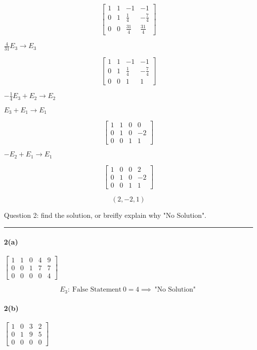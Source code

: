 \documentclass[a4paper,11pt,twoside]{report}
\begin{document}
\[\begin{bmatrix} 1 & 1 & -1 & -1 \\ 0 & 1 & \frac{1}{4} & -\frac{7}{4}\\ 0 & 0 & \frac{31}{4} & \frac{31}{4}  \end{bmatrix} \]

$\frac{4}{31}E_3 \to E_3$

\[\begin{bmatrix} 1 & 1 & -1 & -1 \\ 0 & 1 & \frac{1}{4} & -\frac{7}{4}\\ 0 & 0 & 1 & 1  \end{bmatrix} \]

$-\frac{1}{4}E_3 + E_2 \to E_2$

$E_3 + E_1 \to E_1$

\[\begin{bmatrix} 1 & 1 & 0 & 0 \\ 0 & 1 & 0 & -2\\ 0 & 0 & 1 & 1  \end{bmatrix} \]

$-E_2 + E_1 \to E_1$

\[\begin{bmatrix} 1 & 0 & 0 & 2 \\ 0 & 1 & 0 & -2\\ 0 & 0 & 1 & 1  \end{bmatrix} \]

\[\boxed{(2, -2, 1)}\]

\break

\noindent Question 2: find the solution, or breifly explain why "No Solution". \\ \hrule

\paragraph{2(a)} $\begin{bmatrix} 1 & 1 & 0 & 4 & 9 \\ 0 & 0 & 1 & 7 & 7 \\ 0 & 0 & 0 & 0 & 4 \end{bmatrix} $

\[E_3: \:\text{False Statement}\:0=4 \implies \boxed{\:\text{"No Solution"}\:} \]

\paragraph{2(b)} $\begin{bmatrix} 1 & 0 & 3 & 2 \\ 0 & 1 & 9 & 5 \\ 0 & 0 & 0 & 0 \end{bmatrix} $
\end{document}
